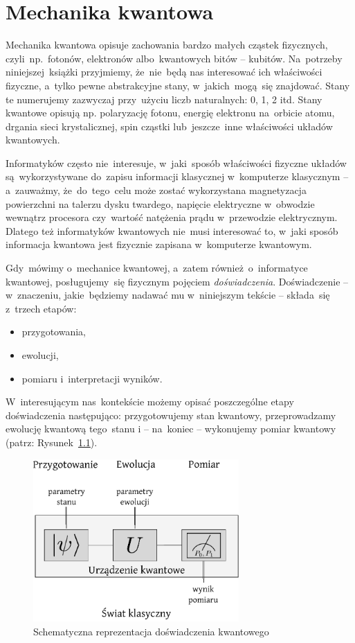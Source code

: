 \chapter{Mechanika kwantowa}

Mechanika kwantowa opisuje zachowania bardzo małych cząstek fizycznych,
czyli~np.~fotonów, elektronów albo~kwantowych bitów -- kubitów.
Na~potrzeby niniejszej~książki przyjmiemy, że~nie~będą nas interesować
ich właściwości fizyczne, a~tylko pewne abstrakcyjne stany,
w~jakich~mogą~się znajdować. Stany te numerujemy zazwyczaj przy~użyciu
liczb naturalnych: 0, 1, 2 itd. Stany kwantowe opisują np. polaryzację
fotonu, energię elektronu na~orbicie atomu, drgania sieci krystalicznej,
spin cząstki lub~jeszcze~inne właściwości układów kwantowych.

Informatyków często nie~interesuje, w~jaki~sposób właściwości fizyczne układów
są~wykorzystywane do~zapisu informacji klasycznej w~komputerze klasycznym --
a~zauważmy, że~do~tego~celu może zostać wykorzystana magnetyzacja powierzchni na
talerzu dysku twardego, napięcie elektryczne w~obwodzie wewnątrz procesora czy~wartość
natężenia prądu w~przewodzie elektrycznym. Dlatego też informatyków kwantowych nie~musi
interesować to, w~jaki sposób informacja kwantowa jest fizycznie zapisana
w~komputerze kwantowym.

Gdy~mówimy o~mechanice kwantowej, a~zatem również~o~informatyce kwantowej, posługujemy~się
fizycznym pojęciem \emph{doświadczenia}. Doświadczenie -- w~znaczeniu, jakie~będziemy
nadawać mu w~niniejszym tekście -- składa~się z~trzech etapów:
\begin{itemize}
	\item przygotowania,
	\item ewolucji,
	\item pomiaru i~interpretacji wyników.
\end{itemize}

W~interesującym nas~kontekście możemy opisać poszczególne etapy doświadczenia
następująco: przygotowujemy stan kwantowy, przeprowadzamy ewolucję kwantową
tego~stanu i -- na~koniec -- wykonujemy pomiar kwantowy (patrz:
Rysunek~\ref{rys:doswiadczenie}).
\begin{figure}[t]
	\centering
	\includegraphics[width=0.7\textwidth]{pics/eksperymentkwantowy}
	\caption{Schematyczna reprezentacja doświadczenia kwantowego}
	\label{rys:doswiadczenie}
\end{figure}


